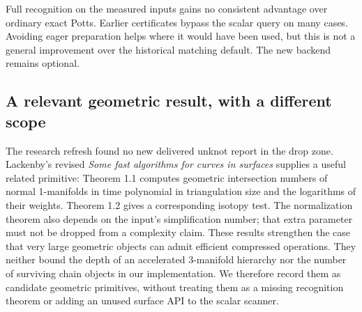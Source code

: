 Full recognition on the measured inputs gains no consistent advantage over
ordinary exact Potts.  Earlier certificates bypass the scalar query on many
cases.  Avoiding eager preparation helps where it would have been used, but
this is not a general improvement over the historical matching default.
The new backend remains optional.

\subsection{A relevant geometric result, with a different scope}

The research refresh found no new delivered unknot report in the drop zone.
Lackenby's revised \emph{Some fast algorithms for curves in surfaces}
\cite{lackenby-curves2026} supplies a useful related primitive: Theorem 1.1
computes geometric intersection numbers of normal 1-manifolds in time
polynomial in triangulation size and the logarithms of their weights.
Theorem 1.2 gives a corresponding isotopy test.  The normalization theorem
also depends on the input's simplification number; that extra parameter
must not be dropped from a complexity claim.
These results strengthen the case that very large geometric objects can
admit efficient compressed operations.  They neither bound the depth of an
accelerated 3-manifold hierarchy nor the number of surviving chain objects
in our implementation.  We therefore record them as candidate geometric
primitives, without treating them as a missing recognition theorem or adding
an unused surface API to the scalar scanner.
